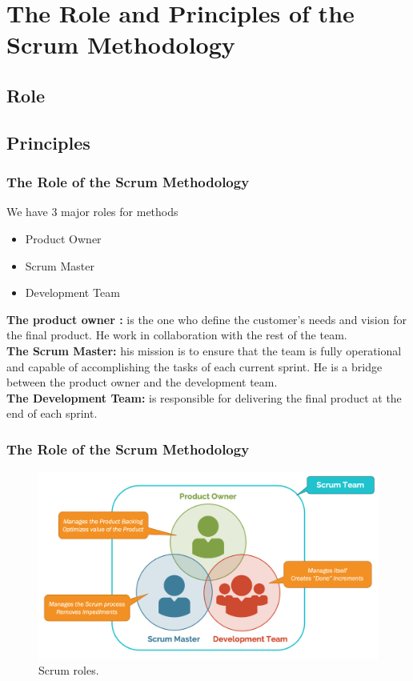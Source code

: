 \documentclass[
	11pt, %
]{beamer}
\begin{document}

\section{The Role and Principles of the Scrum Methodology}
\subsection{Role}
\subsection{Principles}

\begin{frame}
	\frametitle{The Role of the Scrum Methodology}
	We have 3 major roles for methods 
	\begin{itemize}
		\item Product Owner
		\item Scrum Master
		\item Development Team
	\end{itemize}
	\textbf{The product owner :} is the one who define the customer's needs and 
	vision for the final product. He work in collaboration with the rest of the team.
	\\
	\textbf{The Scrum Master:} his mission is to ensure that the team is fully operational and capable
	of accomplishing the tasks of each current sprint. He is a bridge between the product owner and the development team.
	\\
	\textbf{The Development Team:} is responsible for delivering the final 
	product at the end of each sprint.
\end{frame}

\begin{frame}
	\frametitle{The Role of the Scrum Methodology}
	\begin{figure}
		\includegraphics[width=0.8\linewidth]{Role.png}
		\caption{Scrum roles.}
	\end{figure}
\end{frame}
\end{document}
